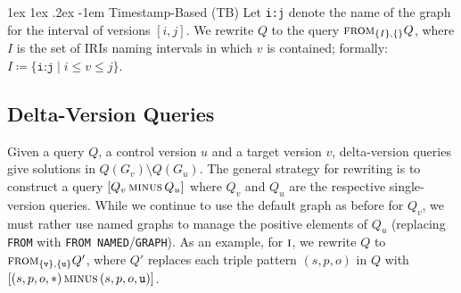 \documentclass{llncs}
\makeatletter
\renewcommand\paragraph{\@startsection{paragraph}{4}{\z@}%
	{1ex \@plus1ex \@minus.2ex}%
	{-1em}%
	{\normalfont\normalsize\itshape}}
\newcommand{\ssyn}[3]{[\ensuremath{#1\,\textsc{#2}\,#3}]}
\newcommand{\sminus}[2]{\ssyn{#1}{minus}{#2}}
\newcommand{\sfrom}[3]{\ensuremath{\textsc{from}_{#2,#3}#1}}
\makeatother
\begin{document}
%
%
%
%


\paragraph{Timestamp-Based (TB)} Let \texttt{i:j} denote the name of the graph for the interval of versions $[i,j]$. We rewrite $Q$ to the query $\sfrom{Q}{\{I\}}{\{\}}$, where $I$ is the set of IRIs naming intervals in which $v$ is contained; formally:  $I \coloneqq \{ \texttt{i:j} \mid i \leq v \leq j \}$.

\subsection{Delta-Version Queries}

Given a query $Q$, a control version $u$ and a target version $v$, delta-version queries give solutions in $Q(G_v) \setminus Q(G_u)$. The general strategy for rewriting is to construct a query $\sminus{Q_v}{Q_u}$ where $Q_v$ and $Q_u$ are the respective single-version queries. While we continue to use the default graph as before for $Q_v$, we must rather use named graphs to manage the positive elements of $Q_u$ (replacing \texttt{FROM} with \texttt{FROM NAMED}/\texttt{GRAPH}). As an example, for $\textsc{i}$, we rewrite $Q$ to \sfrom{Q'}{\{\texttt{v}\}}{\{\texttt{u}\}}, where $Q'$ replaces each triple pattern $(s,p,o)$ in $Q$ with $\sminus{(s,p,o,*)}{(s,p,o,\texttt{u})}$.
\end{document}
